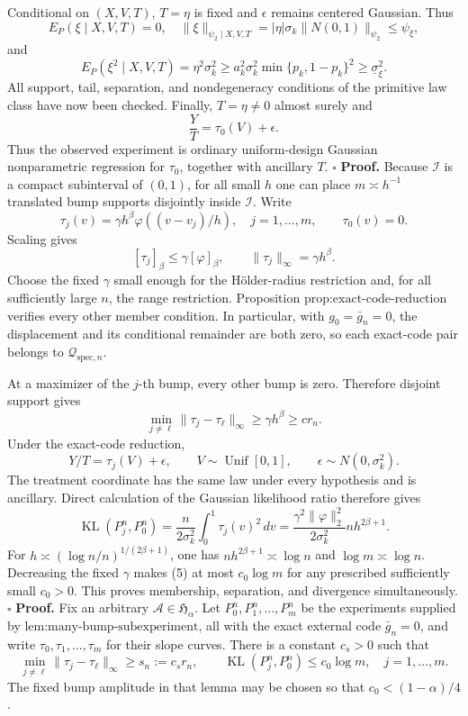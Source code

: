 Conditional on \((X,V,T)\), \(T=\eta\) is fixed and \(\epsilon\) remains centered Gaussian.  Thus
\[
 E_P(\xi\mid X,V,T)=0,
 \quad
 \|\xi\|_{\psi_2\mid X,V,T}
 =|\eta|\sigma_k\|N(0,1)\|_{\psi_2}
 \le\psi_\xi, \tag{2}
\]
and
\[
 E_P(\xi^2\mid X,V,T)=\eta^2\sigma_k^2
 \ge a_k^2\sigma_k^2\min\{p_k,1-p_k\}^2
 \ge\underline\sigma_\xi^2. \tag{3}
\]
All support, tail, separation, and nondegeneracy conditions of the primitive law class have now been checked.  Finally, \(T=\eta\ne0\) almost surely and
\[
 \frac{Y}{T}=\tau_0(V)+\epsilon. \tag{4}
\]
Thus the observed experiment is ordinary uniform-design Gaussian nonparametric regression for \(\tau_0\), together with ancillary \(T\). \(\square\)
\textbf{Proof.}
Because \(\mathcal I\) is a compact subinterval of \((0,1)\), for all small \(h\) one can place \(m\asymp h^{-1}\) translated bump supports disjointly inside \(\mathcal I\).  Write
\[
 \tau_j(v)=\gamma h^\beta\varphi((v-v_j)/h),
 \quad j=1,\ldots,m,
 \qquad \tau_0(v)=0. \tag{1}
\]
Scaling gives
\[
 [\tau_j]_\beta\le\gamma[\varphi]_\beta,
 \qquad \|\tau_j\|_\infty=\gamma h^\beta. \tag{2}
\]
Choose the fixed \(\gamma\) small enough for the H\"older-radius restriction and, for all sufficiently large \(n\), the range restriction.  Proposition \(\text{prop:exact-code-reduction}\) verifies every other member condition.  In particular, with \(g_0=\bar g_n=0\), the displacement and its conditional remainder are both zero, so each exact-code pair belongs to \(\mathcal Q_{\mathrm{spec},n}\).

At a maximizer of the \(j\)-th bump, every other bump is zero.  Therefore disjoint support gives
\[
 \min_{j\ne\ell}\|\tau_j-\tau_\ell\|_\infty
 \ge\gamma h^\beta\ge c r_n. \tag{3}
\]
Under the exact-code reduction,
\[
 Y/T=\tau_j(V)+\epsilon,
 \qquad V\sim\operatorname{Unif}[0,1],
 \qquad \epsilon\sim N(0,\sigma_k^2). \tag{4}
\]
The treatment coordinate has the same law under every hypothesis and is ancillary.  Direct calculation of the Gaussian likelihood ratio therefore gives
\[
 \operatorname{KL}(P_j^n,P_0^n)
 =\frac{n}{2\sigma_k^2}\int_0^1\tau_j(v)^2\,dv
 =\frac{\gamma^2\|\varphi\|_2^2}{2\sigma_k^2}nh^{2\beta+1}. \tag{5}
\]
For \(h\asymp(\log n/n)^{1/(2\beta+1)}\), one has
\(nh^{2\beta+1}\asymp\log n\) and \(\log m\asymp\log n\).  Decreasing the fixed \(\gamma\) makes (5) at most \(c_0\log m\) for any prescribed sufficiently small \(c_0>0\).  This proves membership, separation, and divergence simultaneously. \(\square\)
\textbf{Proof.}
Fix an arbitrary \(\mathcal A\in\mathfrak H_\alpha\).  Let \(P_0^n,P_1^n,\ldots,P_m^n\) be the experiments supplied by \(\text{lem:many-bump-subexperiment}\), all with the exact external code \(\bar g_n=0\), and write \(\tau_0,\tau_1,\ldots,\tau_m\) for their slope curves.  There is a constant \(c_s>0\) such that
\[
 \min_{j\ne\ell}\|\tau_j-\tau_\ell\|_\infty
 \ge s_n:=c_sr_n, \qquad
 \operatorname{KL}(P_j^n,P_0^n)\le c_0\log m,
 \quad j=1,\ldots,m. \tag{1}
\]
The fixed bump amplitude in that lemma may be chosen so that \(c_0<(1-\alpha)/4\).

